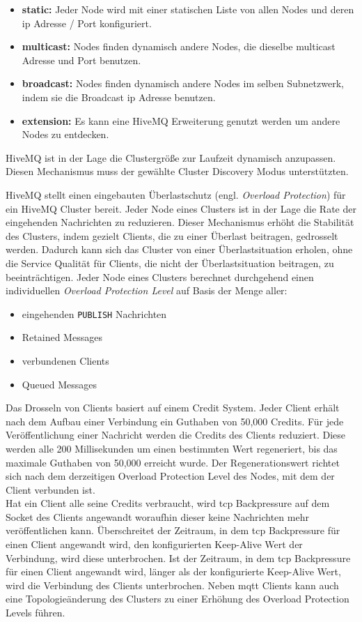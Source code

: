 \begin{itemize}
    \item \textbf{static:} Jeder Node wird mit einer statischen Liste von allen Nodes und deren \ac{ip} Adresse / Port konfiguriert.
    \item \textbf{multicast:} Nodes finden dynamisch andere Nodes, die dieselbe multicast Adresse und Port benutzen.
    \item \textbf{broadcast:} Nodes finden dynamisch andere Nodes im selben Subnetzwerk, indem sie die Broadcast \ac{ip} Adresse benutzen.
    \item \textbf{extension:} Es kann eine HiveMQ Erweiterung genutzt werden um andere Nodes zu entdecken.
\end{itemize}
HiveMQ ist in der Lage die Clustergrö{\ss}e zur Laufzeit dynamisch anzupassen. Diesen Mechanismus muss der gewählte Cluster Discovery Modus unterstützten.
\cite{HiveMQClusterHiveMQ}

 \label{sb:overload-protection}
HiveMQ stellt einen eingebauten Überlastschutz (engl. \textit{Overload Protection}) für ein HiveMQ Cluster bereit. Jeder Node eines Clusters ist in der Lage die Rate der eingehenden Nachrichten zu reduzieren. Dieser Mechanismus erhöht die Stabilität des Clusters, indem gezielt Clients, die zu einer Überlast beitragen, gedrosselt werden.
\cite{ClusterOverloadProtection}
Dadurch kann sich das Cluster von einer Überlastsituation erholen, ohne die Service Qualität für Clients, die nicht der Überlastsituation beitragen, zu beeinträchtigen.
Jeder Node eines Clusters berechnet durchgehend einen individuellen \textit{Overload Protection Level} auf Basis der Menge aller:
\begin{itemize}
    \item eingehenden \verb|PUBLISH| Nachrichten
    \item Retained Messages
    \item verbundenen Clients
    \item Queued Messages
\end{itemize}
Das Drosseln von Clients basiert auf einem Credit System. Jeder Client erhält nach dem Aufbau einer Verbindung ein Guthaben von 50,000 Credits.
Für jede Veröffentlichung einer Nachricht werden die Credits des Clients reduziert.
Diese werden alle 200 Millisekunden um einen bestimmten Wert regeneriert, bis das maximale Guthaben von 50,000 erreicht wurde. Der Regenerationswert richtet sich nach dem derzeitigen Overload Protection Level des Nodes, mit dem der Client verbunden ist.
\cite{ClusterOverloadProtection}
\\
Hat ein Client alle seine Credits verbraucht, wird \ac{tcp} Backpressure auf dem Socket des Clients angewandt woraufhin dieser keine Nachrichten mehr veröffentlichen kann.
Überschreitet der Zeitraum, in dem \ac{tcp} Backpressure für einen Client angewandt wird, den konfigurierten Keep-Alive Wert der Verbindung, wird diese unterbrochen.
Ist der Zeitraum, in dem \ac{tcp} Backpressure für einen Client angewandt wird, länger als der konfigurierte Keep-Alive Wert, wird die Verbindung des Clients unterbrochen.
Neben \ac{mqtt} Clients kann auch eine Topologieänderung des Clusters zu einer Erhöhung des Overload Protection Levels führen.
\cite{ClusterOverloadProtection}

